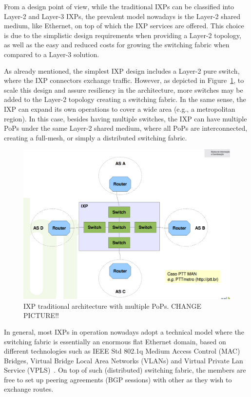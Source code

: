 \documentclass[12pt]{article}
\begin{document}
From a design point of view, while the traditional IXPs can be classified into Layer-2 and Layer-3 IXPs, the prevalent model nowadays is the Layer-2 shared medium, like Ethernet, on top of which the IXP services are offered. This choice is due to the simplistic design requirements when providing a Layer-2 topology, as well as the easy and reduced costs for growing the switching fabric when compared to a Layer-3 solution.

As already mentioned, the simplest IXP design includes a Layer-2 pure switch, where the IXP connectors exchange traffic. However, as depicted in Figure~\ref{fig:ixparch1}, to scale this design and assure resiliency in the architecture, more switches may be added to the Layer-2 topology creating a switching fabric. In the same sense, the IXP can expand its own operations to cover a wide area (e.g., a metropolitan region). In this case, besides having multiple switches, the IXP can have multiple PoPs under the same Layer-2 shared medium, where all PoPs are interconnected, creating a full-mesh, or simply a distributed switching fabric.

\begin{figure}
\centering
\includegraphics[scale=0.25]{imagens/ptt-fabric.png} 
\caption{IXP traditional architecture with multiple PoPs. CHANGE PICTURE!!}
\label{fig:ixparch1}
\end{figure}

In general, most IXPs in operation nowadays adopt a technical model where the switching fabric is essentially an enormous flat Ethernet domain, based on different technologies such as IEEE Std 802.1q Medium Access Control (MAC) Bridges, Virtual Bridge Local Area Networks (VLANs) and Virtual Private Lan Service (VPLS)~\cite{rfc4761,rfc4762}. On top of such (distributed) switching fabric, the members are free to set up peering agreements (BGP sessions) with other as they wish to exchange routes.
\end{document}

